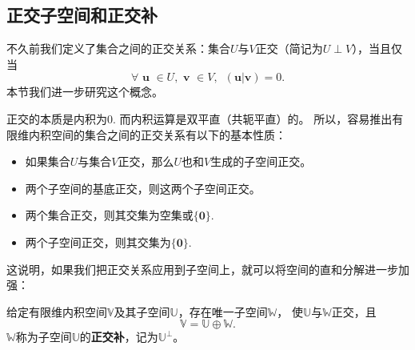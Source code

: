 \documentclass[12pt,UTF8,fontset=none]{ctexbook}
\begin{document}
\subsection{正交子空间和正交补}
不久前我们定义了集合之间的正交关系：集合$U$与$V$正交（简记为$U\perp V$），当且仅当
$$ \forall \,\, \mathbf{u}\,\, \in U, \,\, \mathbf{v} \,\, \in V, \,\,\, (\mathbf{u} | \mathbf{v}) = 0.$$
本节我们进一步研究这个概念。

正交的本质是内积为0. 而内积运算是双平直（共轭平直）的。
所以，容易推出有限维内积空间的集合之间的正交关系有以下的基本性质：
\begin{itemize}
    \item 如果集合$U$与集合$V$正交，那么$U$也和$V$生成的子空间正交。
    \item 两个子空间的基底正交，则这两个子空间正交。
    \item 两个集合正交，则其交集为空集或$\{\mathbf{0}\}$.
    \item 两个子空间正交，则其交集为$\{\mathbf{0}\}$.
\end{itemize}

这说明，如果我们把正交关系应用到子空间上，就可以将空间的直和分解进一步加强：
\begin{pp}\label{pp:7_7}
    给定有限维内积空间$\mathbb{V}$及其子空间$\mathbb{U}$，存在唯一子空间$\mathbb{W}$，
    使$\mathbb{U}$与$\mathbb{W}$正交，且
    $$ \mathbb{V} = \mathbb{U} \oplus \mathbb{W}.$$
    $\mathbb{W}$称为子空间$\mathbb{U}$的\textbf{正交补}，记为$\mathbb{U}^{\perp}$。
\end{pp}
\end{document}

